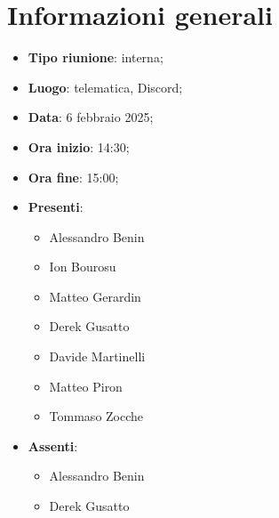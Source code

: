\section{Informazioni generali}
\begin{itemize}
  \item \textbf{Tipo riunione}: interna;
  \item \textbf{Luogo}: telematica, Discord;
  \item \textbf{Data}: 6 febbraio 2025;
  \item \textbf{Ora inizio}: 14:30;
  \item \textbf{Ora fine}: 15:00;
  
  \item \textbf{Presenti}:
  \begin{itemize}
    \item Alessandro Benin
    \item Ion Bourosu
    \item Matteo Gerardin
    \item Derek Gusatto
    \item Davide Martinelli
    \item Matteo Piron
    \item Tommaso Zocche
  \end{itemize}

  \item \textbf{Assenti}:
  \begin{itemize}
    \item Alessandro Benin
    \item Derek Gusatto
  \end{itemize}
 
\end{itemize}